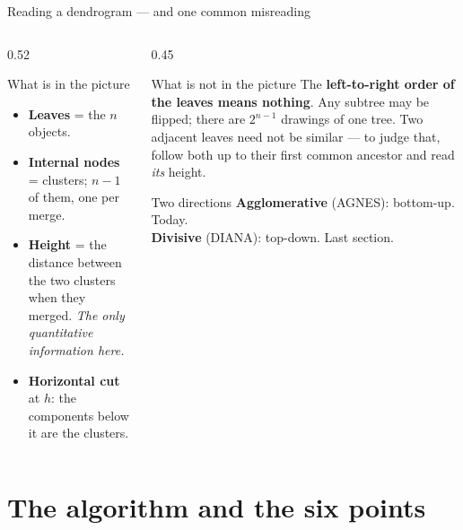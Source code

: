 \documentclass[aspectratio=169]{beamer}
\begin{document}
\begin{frame}[shrink=17]{Reading a dendrogram --- and one common misreading}
  \begin{columns}[T]
    \begin{column}{0.52\textwidth}
      \begin{block}{What is in the picture}
        \begin{itemize}
          \item \textbf{Leaves} = the $n$ objects.
          \item \textbf{Internal nodes} = clusters; $n-1$ of them, one per
            merge.
          \item \textbf{Height} = the distance between the two clusters when
            they merged. \emph{The only quantitative information here.}
          \item \textbf{Horizontal cut} at $h$: the components below it are
            the clusters.
        \end{itemize}
      \end{block}
    \end{column}
    \begin{column}{0.45\textwidth}
      \begin{alertblock}{What is not in the picture}
        The \textbf{left-to-right order of the leaves means nothing}. Any
        subtree may be flipped; there are $2^{n-1}$ drawings of one tree.
        Two adjacent leaves need not be similar --- to judge that, follow both
        up to their first common ancestor and read \emph{its} height.
      \end{alertblock}
      \begin{block}{Two directions}
        \small
        \textbf{Agglomerative} (AGNES): bottom-up. Today.\\
        \textbf{Divisive} (DIANA): top-down. Last section.
      \end{block}
    \end{column}
  \end{columns}
\end{frame}

\section[The algorithm]{The algorithm and the six points}
\label{sec:algo}
\end{document}
